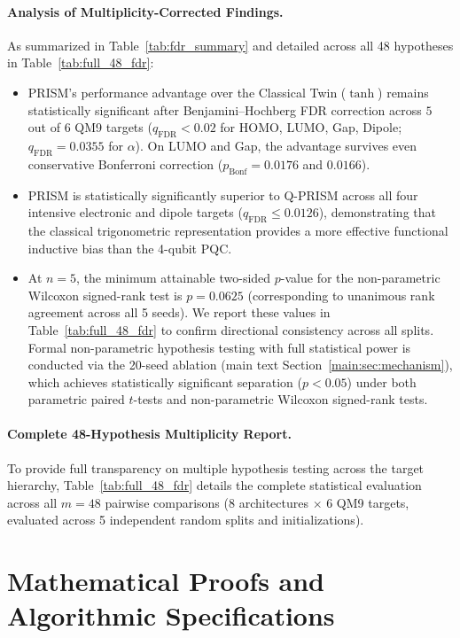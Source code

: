 \documentclass[10pt,twocolumn,letterpaper]{article}
\begin{document}
\paragraph{Analysis of Multiplicity-Corrected Findings.}
As summarized in Table~\ref{tab:fdr_summary} and detailed across all 48 hypotheses in Table~\ref{tab:full_48_fdr}:
\begin{itemize}
    \item PRISM's performance advantage over the Classical Twin ($\tanh$) remains statistically significant after Benjamini--Hochberg FDR correction across $5$ out of $6$ QM9 targets ($q_{\mathrm{FDR}} < 0.02$ for HOMO, LUMO, Gap, Dipole; $q_{\mathrm{FDR}} = 0.0355$ for $\alpha$). On LUMO and Gap, the advantage survives even conservative Bonferroni correction ($p_{\mathrm{Bonf}} = 0.0176$ and $0.0166$).
    \item PRISM is statistically significantly superior to Q-PRISM across all four intensive electronic and dipole targets ($q_{\mathrm{FDR}} \le 0.0126$), demonstrating that the classical trigonometric representation provides a more effective functional inductive bias than the 4-qubit PQC.
    \item At $n = 5$, the minimum attainable two-sided $p$-value for the non-parametric Wilcoxon signed-rank test is $p = 0.0625$ (corresponding to unanimous rank agreement across all 5 seeds). We report these values in Table~\ref{tab:full_48_fdr} to confirm directional consistency across all splits. Formal non-parametric hypothesis testing with full statistical power is conducted via the 20-seed ablation (main text Section~\ref{main:sec:mechanism}), which achieves statistically significant separation ($p < 0.05$) under both parametric paired $t$-tests and non-parametric Wilcoxon signed-rank tests.
\end{itemize}

\paragraph{Complete 48-Hypothesis Multiplicity Report.}
To provide full transparency on multiple hypothesis testing across the target hierarchy, Table~\ref{tab:full_48_fdr} details the complete statistical evaluation across all $m = 48$ pairwise comparisons ($8$ architectures $\times$ $6$ QM9 targets, evaluated across 5 independent random splits and initializations).



\section{Mathematical Proofs and Algorithmic Specifications}
\label{sm:proof}
\label{sm:pseudocode}
\end{document}
